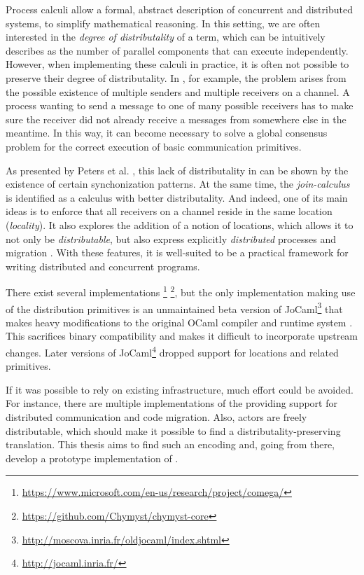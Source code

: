 Process calculi allow a formal, abstract description of concurrent
and distributed systems, to simplify mathematical reasoning.
In this setting, we are often interested in the
\emph{degree of distributality} of a term,
which can be intuitively describes as the number of parallel components
that can execute independently.
However, when implementing these calculi in practice,
it is often not possible to preserve their degree of distributality.
In \picalc, for example,
the problem arises from the possible existence of multiple senders
and multiple receivers on a channel.
A process wanting to send a message to one of many possible receivers
has to make sure the receiver did not already receive a messages
from somewhere else in the meantime.
In this way, it can become necessary to solve a global consensus problem
for the correct execution of basic communication primitives.

As presented by Peters et al. \cite{peters_distributability_2013},
this lack of distributality in \asyncpicalc can be shown by the existence of
certain synchonization patterns.
At the same time, the \emph{join-calculus} \cite{fournet_reflexive_1996}
is identified as a calculus with better distributality.
And indeed, one of its main ideas is to enforce that all receivers on a channel
reside in the same location (\emph{locality}).
It also explores the addition of a notion of locations,
which allows it to not only be \emph{distributable},
but also express explicitly \emph{distributed} processes
and migration \cite{fournet_calculus_1996}.
With these features, it is well-suited to be a practical framework for
writing distributed and concurrent programs.

There exist several implementations
\footnote{\url{https://www.microsoft.com/en-us/research/project/comega/}}
\footnote{\url{https://github.com/Chymyst/chymyst-core}},
but the only implementation making use of the distribution primitives
is an unmaintained beta version of
JoCaml\footnote{\url{http://moscova.inria.fr/oldjocaml/index.shtml}}
that makes heavy modifications to the original OCaml compiler and runtime system
\cite{conchon_jocaml:_1999}.
This sacrifices binary compatibility and makes it difficult to incorporate
upstream changes.
Later versions of JoCaml\footnote{\url{http://jocaml.inria.fr/}}
dropped support for locations and related primitives.

If it was possible to rely on existing infrastructure,
much effort could be avoided.
For instance, there are multiple implementations of the \actormodel
providing support for distributed communication and code migration.
Also, actors are freely distributable, which should make it possible
to find a distributality-preserving translation.
This thesis aims to find such an encoding and, going from there,
develop a prototype implementation of \distjoincalc.


